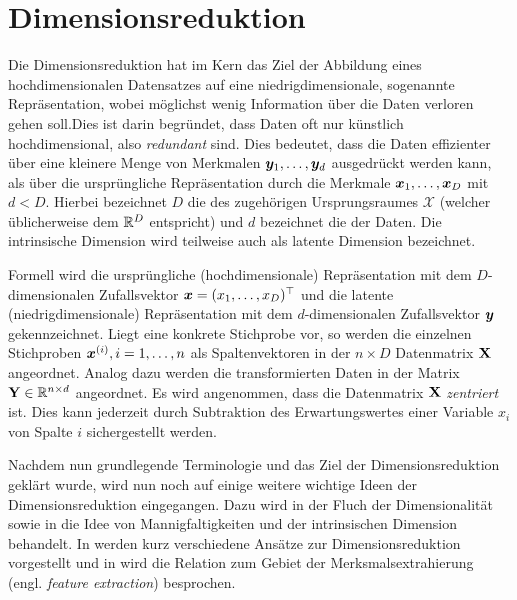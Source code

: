 \chapter{Dimensionsreduktion}
\label{ch:Dimensionsreduktion}

Die Dimensionsreduktion hat im Kern das Ziel der Abbildung eines hochdimensionalen Datensatzes auf
eine niedrigdimensionale, sogenannte  Repräsentation, wobei möglichst wenig
Information über die Daten verloren gehen soll.\addref Dies ist darin begründet, dass Daten oft nur
künstlich hochdimensional, also \textit{redundant} sind. Dies bedeutet, dass die Daten effizienter
über eine kleinere Menge von Merkmalen $\bm{y}_1,\ldots,\bm{y}_d$ ausgedrückt werden kann,
als über die ursprüngliche Repräsentation durch die Merkmale $\bm{x}_1,\ldots,\bm{x}_D$ mit
$d < D$. Hierbei bezeichnet $D$ die  des zugehörigen
Ursprungsraumes $\mathcal{X}$ (welcher üblicherweise dem $\mathbb{R}^D$ entspricht) und $d$ bezeichnet
die  der Daten. Die intrinsische Dimension wird teilweise auch als
latente Dimension bezeichnet.

Formell wird die ursprüngliche (hochdimensionale) Repräsentation mit dem $D$-dimensionalen
Zufallsvektor $\bm{x} = (x_1, \ldots, x_D)^\top$ und die latente (niedrigdimensionale)
Repräsentation mit dem $d$-dimensionalen Zufallsvektor $\bm{y}$ gekennzeichnet. Liegt eine
konkrete Stichprobe vor, so werden die einzelnen Stichproben $\bm{x}^{(i)}, i = 1,\ldots,n$ als
Spaltenvektoren in der $n \times D$ Datenmatrix $\mathbf{X}$ angeordnet. Analog dazu werden die
transformierten Daten in der Matrix $\mathbf{Y} \in \mathbb{R}^{n \times d}$ angeordnet. Es wird
angenommen, dass die Datenmatrix $\mathbf{X}$ \textit{zentriert} ist. Dies kann jederzeit durch
Subtraktion des Erwartungswertes einer Variable $x_i$ von Spalte $i$ sichergestellt werden.

Nachdem nun grundlegende Terminologie und das Ziel der Dimensionsreduktion geklärt wurde, wird nun
noch auf einige weitere wichtige Ideen der Dimensionsreduktion eingegangen. Dazu wird in
 der Fluch der Dimensionalität sowie in
 die Idee von Mannigfaltigkeiten und
der intrinsischen Dimension behandelt. In  werden kurz
verschiedene Ansätze zur Dimensionsreduktion vorgestellt und in
 wird die Relation zum Gebiet der
Merksmalsextrahierung (engl. \textit{feature extraction}) besprochen.

